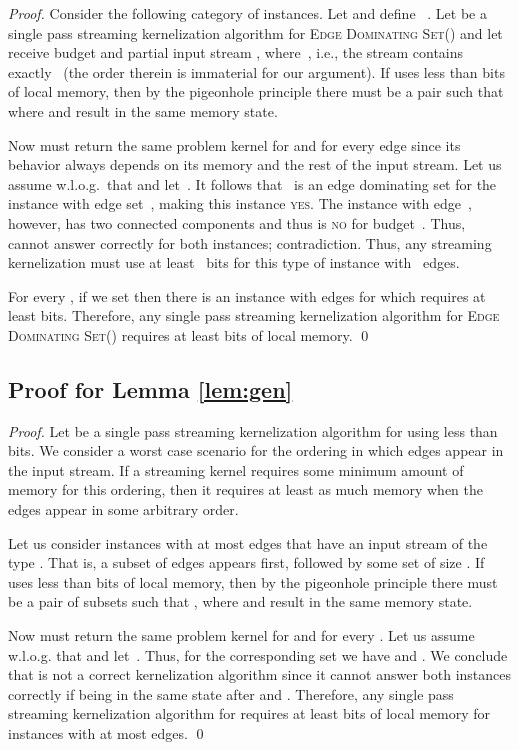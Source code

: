 \documentclass[draft,a4paper]{llncs}
\newcommand{\yes}{\textsc{yes}\xspace}
\newcommand{\no}{\textsc{no}\xspace}
\newcommand{\EDSk}{\textsc{Edge Dominating Set()}\xspace}
\begin{document}
\begin{proof}
Consider the following category of instances. Let  and define ~. Let  be a single pass streaming kernelization algorithm for \EDSk and let  receive budget  and partial input stream ,
where~, i.e., the stream contains exactly~ (the order therein is immaterial for our argument).
If  uses less than  bits of local memory, then by the pigeonhole principle there must be a pair  such that  where  and  result in the same memory state. 

Now  must return the same problem kernel for  and  for every edge  since its behavior always depends on its memory and the rest of the input stream. Let us assume w.l.o.g.\ that  and let~. It follows that~ is an edge dominating set for the instance with edge set~, making this instance \yes. The instance with edge~, however, has two connected components and thus is \no for budget~. Thus,~ cannot answer correctly for both instances; contradiction. Thus, any streaming kernelization must use at least~ bits for this type of instance with~ edges.

For every , if we set  then there is an instance with  edges for which  requires at least  bits. Therefore, any single pass streaming kernelization algorithm for \EDSk requires at least  bits of local memory. \qed \end{proof}
\subsection{Proof for Lemma \ref{lem:gen}}
\begin{proof}
 Let  be a single pass streaming kernelization algorithm for  using less than  bits. We consider a worst case scenario for the ordering in which edges appear in the input stream. If a streaming kernel requires some minimum amount of memory for this ordering, then it requires at least as much memory when the edges appear in some arbitrary order. 
 
 Let us consider instances with at most  edges that have an input stream of the type . 
 That is, a subset of edges  appears first, followed by some set  of size . If  uses less than  bits of local memory, then by the pigeonhole principle there must be a pair of subsets  such that , where  and  result in the same memory state.
 
 Now  must return the same problem kernel for  and  for every . Let us assume w.l.o.g. that  and let~. Thus, for the corresponding set  we have  and . We conclude that  is not a correct kernelization algorithm since it cannot answer both instances correctly if being in the same state after  and . Therefore, any single pass streaming kernelization algorithm for  requires at least  bits of local memory for instances with at most  edges.
\qed \end{proof}
\end{document}
